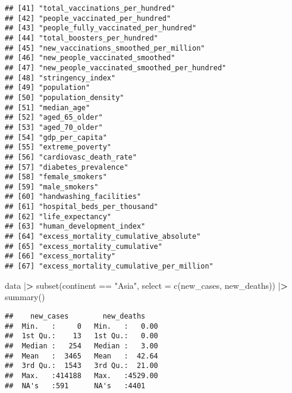 \documentclass[
]{article}
\newenvironment{Shaded}{\begin{snugshade}}{\end{snugshade}}
\newcommand{\AttributeTok}[1]{\textcolor[rgb]{0.77,0.63,0.00}{#1}}
\newcommand{\ErrorTok}[1]{\textcolor[rgb]{0.64,0.00,0.00}{\textbf{#1}}}
\newcommand{\FunctionTok}[1]{\textcolor[rgb]{0.00,0.00,0.00}{#1}}
\newcommand{\NormalTok}[1]{#1}
\newcommand{\SpecialCharTok}[1]{\textcolor[rgb]{0.00,0.00,0.00}{#1}}
\newcommand{\StringTok}[1]{\textcolor[rgb]{0.31,0.60,0.02}{#1}}
\begin{document}
\begin{verbatim}
## [41] "total_vaccinations_per_hundred"            
## [42] "people_vaccinated_per_hundred"             
## [43] "people_fully_vaccinated_per_hundred"       
## [44] "total_boosters_per_hundred"                
## [45] "new_vaccinations_smoothed_per_million"     
## [46] "new_people_vaccinated_smoothed"            
## [47] "new_people_vaccinated_smoothed_per_hundred"
## [48] "stringency_index"                          
## [49] "population"                                
## [50] "population_density"                        
## [51] "median_age"                                
## [52] "aged_65_older"                             
## [53] "aged_70_older"                             
## [54] "gdp_per_capita"                            
## [55] "extreme_poverty"                           
## [56] "cardiovasc_death_rate"                     
## [57] "diabetes_prevalence"                       
## [58] "female_smokers"                            
## [59] "male_smokers"                              
## [60] "handwashing_facilities"                    
## [61] "hospital_beds_per_thousand"                
## [62] "life_expectancy"                           
## [63] "human_development_index"                   
## [64] "excess_mortality_cumulative_absolute"      
## [65] "excess_mortality_cumulative"               
## [66] "excess_mortality"                          
## [67] "excess_mortality_cumulative_per_million"
\end{verbatim}

\begin{Shaded}
\begin{Highlighting}[]
\NormalTok{data }\SpecialCharTok{|}\ErrorTok{\textgreater{}} \FunctionTok{subset}\NormalTok{(continent }\SpecialCharTok{==} \StringTok{"Asia"}\NormalTok{, }\AttributeTok{select =} \FunctionTok{c}\NormalTok{(new\_cases, new\_deaths)) }\SpecialCharTok{|}\ErrorTok{\textgreater{}} \FunctionTok{summary}\NormalTok{()}
\end{Highlighting}
\end{Shaded}

\begin{verbatim}
##    new_cases        new_deaths     
##  Min.   :     0   Min.   :   0.00  
##  1st Qu.:    13   1st Qu.:   0.00  
##  Median :   254   Median :   3.00  
##  Mean   :  3465   Mean   :  42.64  
##  3rd Qu.:  1543   3rd Qu.:  21.00  
##  Max.   :414188   Max.   :4529.00  
##  NA's   :591      NA's   :4401
\end{verbatim}

\begin{Shaded}
\end{Shaded}
\end{document}
